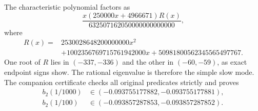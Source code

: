 \documentclass[11pt]{article}
\begin{document}
The characteristic polynomial factors as
\[
\frac{x(250000x+4966671)R(x)}{632507162050000000000000},
\]
where
\begin{align*}
R(x)={}&2530028648200000000x^2\\
&+1002356769715761942000x+50981800562345565497767.
\end{align*}
One root of $R$ lies in $(-337,-336)$ and the other in $(-60,-59)$, as exact endpoint signs show. The rational eigenvalue is therefore the simple slow mode. The companion certificate checks all original predicates strictly and proves
\begin{align*}
b_2(1/1000)&\in(-0.093755177882,-0.093755177881),\\
b_2(1/100)&\in(-0.093857287853,-0.093857287852).
\end{align*}
\end{document}
